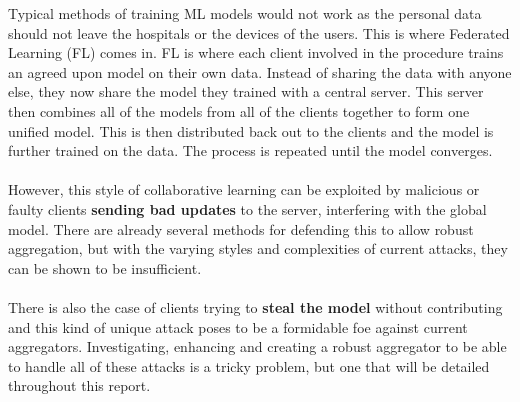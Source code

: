 Typical methods of training ML models would not work as the personal data should not leave the hospitals or the devices of the users. 
This is where Federated Learning (FL) \cite{federated_comic} comes in. 
FL is where each client involved in the procedure trains an agreed upon model on their own data. 
Instead of sharing the data with anyone else, they now share the model they trained with a central server. 
This server then combines all of the models from all of the clients together to form one unified model. 
This is then distributed back out to the clients and the model is further trained on the data. 
The process is repeated until the model converges.
\\ \\
However, this style of collaborative learning can be exploited by malicious or faulty clients \textbf{sending bad updates} to the server, interfering with the global model. 
There are already several methods for defending this to allow robust aggregation, but with the varying styles and complexities of current attacks, they can be shown to be insufficient.
\\ \\
There is also the case of clients trying to \textbf{steal the model} without contributing and this kind of unique attack poses to be a formidable foe against current aggregators.
Investigating, enhancing and creating a robust aggregator to be able to handle all of these attacks is a tricky problem, but one that will be detailed throughout this report.


